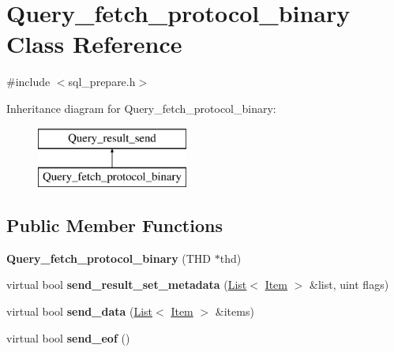 \hypertarget{classQuery__fetch__protocol__binary}{}\section{Query\+\_\+fetch\+\_\+protocol\+\_\+binary Class Reference}
\label{classQuery__fetch__protocol__binary}


{\ttfamily \#include $<$sql\+\_\+prepare.\+h$>$}

Inheritance diagram for Query\+\_\+fetch\+\_\+protocol\+\_\+binary\+:\begin{figure}[H]
\begin{center}
\leavevmode
\includegraphics[height=2.000000cm]{classQuery__fetch__protocol__binary}
\end{center}
\end{figure}
\subsection*{Public Member Functions}
\begin{DoxyCompactItemize}
\item 
\mbox{\label{classQuery__fetch__protocol__binary_a547c8e9c87e8200020b9c94ef809f8dc}} 
{\bfseries Query\+\_\+fetch\+\_\+protocol\+\_\+binary} (T\+HD $\ast$thd)
\item 
\mbox{\label{classQuery__fetch__protocol__binary_a22cb1858cf66f94e0df3f84f6e38ad18}} 
virtual bool {\bfseries send\+\_\+result\+\_\+set\+\_\+metadata} (\mbox{\hyperlink{classList}{List}}$<$ \mbox{\hyperlink{classItem}{Item}} $>$ \&list, uint flags)
\item 
\mbox{\label{classQuery__fetch__protocol__binary_ab7c3717efa167a4d3d7589ac7d93ebda}} 
virtual bool {\bfseries send\+\_\+data} (\mbox{\hyperlink{classList}{List}}$<$ \mbox{\hyperlink{classItem}{Item}} $>$ \&items)
\item 
\mbox{\label{classQuery__fetch__protocol__binary_ae8f5a3c5309a1d444fd75072aac12c60}} 
virtual bool {\bfseries send\+\_\+eof} ()
\end{DoxyCompactItemize}


